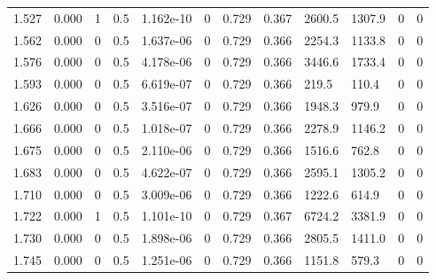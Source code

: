 \documentclass[preview]{standalone}
\begin{document}
{{{\begin{tabular}{L{1.2cm}C{1.2cm} C{0.3cm}C{0.5cm} C{1.4cm}C{1.4cm} C{1.4cm}C{1.4cm} C{1.6cm}C{1.6cm} C{1.6cm}C{1.6cm}}
  1.527  &  0.000  & 1     & 0.5 &  1.162e-10  & 0  &  0.729&   0.367& 2600.5 & 1307.9   &  0 & 0  \\ 
  1.562  &  0.000  & 0     & 0.5 &  1.637e-06  & 0  &  0.729&   0.366& 2254.3 & 1133.8   &  0 & 0  \\ 
  1.576  &  0.000  & 0     & 0.5 &  4.178e-06  & 0  &  0.729&   0.366& 3446.6 & 1733.4   &  0 & 0  \\ 
  1.593  &  0.000  & 0     & 0.5 &  6.619e-07  & 0  &  0.729&   0.366& 219.5 & 110.4   &  0 & 0  \\ 
  1.626  &  0.000  & 0     & 0.5 &  3.516e-07  & 0  &  0.729&   0.366& 1948.3 & 979.9   &  0 & 0  \\ 
  1.666  &  0.000  & 0     & 0.5 &  1.018e-07  & 0  &  0.729&   0.366& 2278.9 & 1146.2   &  0 & 0  \\ 
  1.675  &  0.000  & 0     & 0.5 &  2.110e-06  & 0  &  0.729&   0.366& 1516.6 & 762.8   &  0 & 0  \\ 
  1.683  &  0.000  & 0     & 0.5 &  4.622e-07  & 0  &  0.729&   0.366& 2595.1 & 1305.2   &  0 & 0  \\ 
  1.710  &  0.000  & 0     & 0.5 &  3.009e-06  & 0  &  0.729&   0.366& 1222.6 & 614.9   &  0 & 0  \\ 
  1.722  &  0.000  & 1     & 0.5 &  1.101e-10  & 0  &  0.729&   0.367& 6724.2 & 3381.9   &  0 & 0  \\ 
  1.730  &  0.000  & 0     & 0.5 &  1.898e-06  & 0  &  0.729&   0.366& 2805.5 & 1411.0   &  0 & 0  \\ 
  1.745  &  0.000  & 0     & 0.5 &  1.251e-06  & 0  &  0.729&   0.366& 1151.8 & 579.3   &  0 & 0  \\ 
\hline 
\end{tabular} 

}}}
\end{document}
